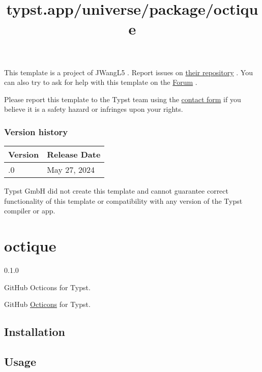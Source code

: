 This template is a project of JWangL5 . Report issues on
\href{https://github.com/JWangL5/CAU-ThesisTemplate-Typst}{their
repository} . You can also try to ask for help with this template on the
\href{https://forum.typst.app}{Forum} .

Please report this template to the Typst team using the
\href{https://typst.app/contact}{contact form} if you believe it is a
safety hazard or infringes upon your rights.

\label{versions}
\subsubsection{Version history}\label{version-history}

\begin{longtable}[]{@{}ll@{}}
\toprule\noalign{}
Version & Release Date \\
\midrule\noalign{}
\endhead
\bottomrule\noalign{}
\endlastfoot
0.1.0 & May 27, 2024 \\
\end{longtable}

Typst GmbH did not create this template and cannot guarantee correct
functionality of this template or compatibility with any version of the
Typst compiler or app.


\title{typst.app/universe/package/octique}

\label{banner}
\section{octique}\label{octique}

{ 0.1.0 }

GitHub Octicons for Typst.

\label{readme}
GitHub \href{https://primer.style/foundations/icons/}{Octicons} for
Typst.

\subsection{Installation}\label{installation}

\begin{Shaded}
\begin{Highlighting}[]
\end{Highlighting}
\end{Shaded}

\subsection{Usage}\label{usage}

